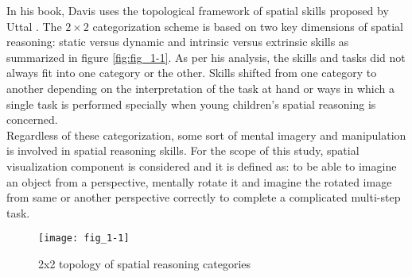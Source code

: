 In his book, Davis \parencite{davis2015spatial} uses the topological framework of spatial skills proposed by Uttal \parencite{uttal2013malleability}. The $ 2 \times 2 $ categorization scheme is based on two key dimensions of spatial reasoning: static versus dynamic and intrinsic versus extrinsic skills as summarized in figure \ref{fig:fig_1-1}. As per his analysis, the skills and tasks did not always fit into one category or the other. Skills shifted from one category to another depending on the interpretation of the task at hand or ways in which a single task is performed specially when young children's spatial reasoning is concerned. \\
Regardless of these categorization, some sort of mental imagery and manipulation is involved in spatial reasoning skills. For the scope of this study, spatial visualization component is considered and it is defined as: to be able to imagine an object from a perspective, mentally rotate it and imagine the rotated image from same or another perspective correctly to complete a complicated multi-step task.
\begin{figure}[t] %
   \centering
   \texttt{[image: fig\_1-1]}
   \caption[{2x2 topology of spatial reasoning categories}]{2x2 topology of spatial reasoning categories \parencite{davis2015spatial}}
   \label{fig:fig_2-1}
\end{figure}


